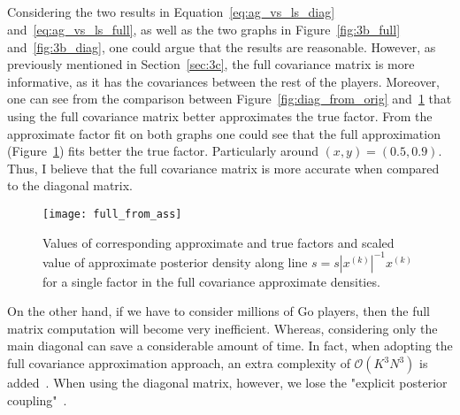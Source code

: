 \documentclass[a4paper,11pt]{article}
\theoremstyle{mytheor}
\begin{document}
\subsection{}
Considering the two results in Equation~\ref{eq:ag_vs_ls_diag} and~\ref{eq:ag_vs_ls_full}, as well as the two graphs in Figure~\ref{fig:3b_full} and~\ref{fig:3b_diag}, one could argue that the results are reasonable. However, as previously mentioned in Section~\ref{sec:3c}, the full covariance matrix is more informative, as it has the covariances between the rest of the players. Moreover, one can see from the comparison between Figure~\ref{fig:diag_from_orig} and~\ref{fig:full_from_orig} that using the full covariance matrix better approximates the true factor. From the approximate factor fit on both graphs one could see that the full approximation (Figure~\ref{fig:full_from_orig}) fits better the true factor. Particularly around $(x,y)=(0.5,0.9)$. Thus, I believe that the full covariance matrix is more accurate when compared to the diagonal matrix. 

\begin{figure}[htpb!]
    \centering
    \texttt{[image: full\_from\_ass]}
    \caption{Values of corresponding approximate and true factors and scaled value of approximate posterior density along line $s=s|x^{(k)}|^{-1}x^{(k)}$ for a single factor in the full covariance approximate densities.}
    \label{fig:full_from_orig}
\end{figure}

On the other hand, if we have to consider millions of Go players, then the full matrix computation will become very inefficient. Whereas, considering only the main diagonal can save a considerable amount of time. In fact, when adopting the full covariance approximation approach, an extra complexity of $\mathcal{O}(K^3N^3)$ is added~\cite{scholkopf2007advances}. When using the diagonal matrix, however, we lose the "explicit posterior coupling"~\cite{scholkopf2007advances}.

\clearpage



\clearpage
\end{document}
